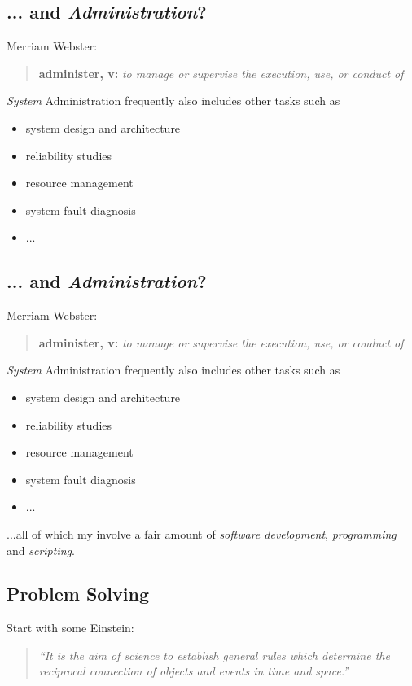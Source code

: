 \documentclass[xga]{xdvislides}
\begin{document}
\subsection{... and {\em Administration}?} Merriam Webster: \begin{quote} {\bf
administer, v:} {\em to manage or supervise the execution, use, or conduct of}
\\ \end{quote}

{\em System} Administration frequently also includes other tasks such as
\begin{itemize}
	\item system design and architecture
	\item reliability studies
	\item resource management
	\item system fault diagnosis
	\item ...
\end{itemize}


\subsection{... and {\em Administration}?}
Merriam Webster:
\begin{quote}
	{\bf administer, v:} {\em to manage or supervise the execution, use, or conduct of} \\
\end{quote}

{\em System} Administration frequently also includes other tasks such as
\begin{itemize}
	\item system design and architecture
	\item reliability studies
	\item resource management
	\item system fault diagnosis
	\item ...
\end{itemize}
\vspace{.5in}

...all of which my involve a fair amount of {\em software development}, {\em
programming} and {\em scripting}.

\subsection{Problem Solving}
Start with some Einstein:
\begin{quote}
{\em ``It is the aim of science to establish general rules which determine the
reciprocal connection of objects and events in time and space.''}
\end{quote}
\end{document}
